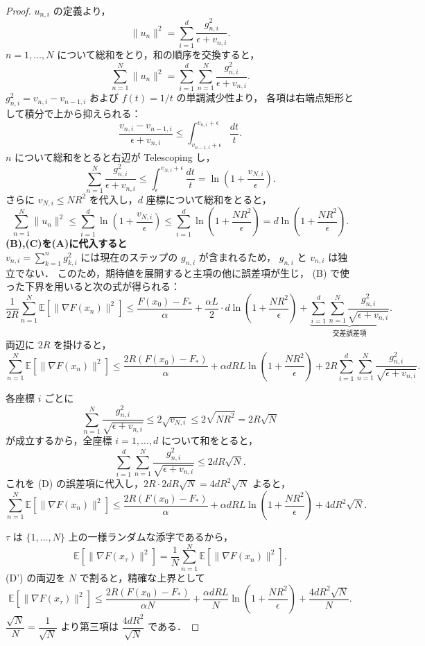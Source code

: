 \documentclass[dvipdfmx,a4paper,11pt]{jsarticle}
\begin{document}
\begin{proof}
\noindent
$u_{n,i}$ の定義より，
\[
    \|u_n\|^2 = \sum_{i=1}^d \frac{g_{n,i}^2}{\epsilon + v_{n,i}}.
\]
$n = 1, \ldots, N$ について総和をとり，和の順序を交換すると，
\[
    \sum_{n=1}^N \|u_n\|^2
    = \sum_{i=1}^d \sum_{n=1}^N \frac{g_{n,i}^2}{\epsilon + v_{n,i}}.
\]
$g_{n,i}^2 = v_{n,i} - v_{n-1,i}$ および $f(t)=1/t$ の単調減少性より，
各項は右端点矩形として積分で上から抑えられる：
\[
    \frac{v_{n,i}-v_{n-1,i}}{\epsilon+v_{n,i}}
    \leq \int_{v_{n-1,i}+\epsilon}^{v_{n,i}+\epsilon} \frac{dt}{t}.
\]
$n$ について総和をとると右辺が Telescoping し，
\[
    \sum_{n=1}^N \frac{g_{n,i}^2}{\epsilon+v_{n,i}}
    \leq \int_\epsilon^{v_{N,i}+\epsilon}\frac{dt}{t}
    = \ln\!\left(1+\frac{v_{N,i}}{\epsilon}\right).
\]
さらに $v_{N,i} \leq NR^2$ を代入し，$d$ 座標について総和をとると，
\[
    \sum_{n=1}^N \|u_n\|^2
    \leq \sum_{i=1}^d \ln\!\left(1+\frac{v_{N,i}}{\epsilon}\right)
    \leq \sum_{i=1}^d \ln\!\left(1+\frac{NR^2}{\epsilon}\right)
    = d\ln\!\left(1+\frac{NR^2}{\epsilon}\right).
    \tag{C}
\]
\textbf{(B),(C)を(A)に代入すると}\\
\noindent
$v_{n,i} = \sum_{k=1}^n g_{k,i}^2$ には現在のステップの $g_{n,i}$ が含まれるため，
$g_{n,i}$ と $v_{n,i}$ は独立でない．
このため，期待値を展開すると主項の他に誤差項が生じ，
(B) で使った下界を用いると次の式が得られる：
\[
    \frac{1}{2R}\sum_{n=1}^N \mathbb{E}\!\left[\|\nabla F(x_n)\|^2\right]
    \leq \frac{F(x_0)-F_*}{\alpha}
    + \frac{\alpha L}{2}\cdot d\ln\!\left(1+\frac{NR^2}{\epsilon}\right)
    + \underbrace{\sum_{i=1}^d\sum_{n=1}^N \frac{g_{n,i}^2}{\sqrt{\epsilon+v_{n,i}}}}_{\text{交差誤差項}}.
\]
両辺に $2R$ を掛けると，
\[
    \sum_{n=1}^N \mathbb{E}\!\left[\|\nabla F(x_n)\|^2\right]
    \leq \frac{2R(F(x_0)-F_*)}{\alpha}
    + \alpha dRL\ln\!\left(1+\frac{NR^2}{\epsilon}\right)
    + 2R\sum_{i=1}^d\sum_{n=1}^N \frac{g_{n,i}^2}{\sqrt{\epsilon+v_{n,i}}}.
    \tag{D}
\]

\noindent
各座標 $i$ ごとに
\[
    \sum_{n=1}^N \frac{g_{n,i}^2}{\sqrt{\epsilon+v_{n,i}}}
    \leq 2\sqrt{v_{N,i}} \leq 2\sqrt{NR^2} = 2R\sqrt{N}
\]
が成立するから，全座標 $i=1,\ldots,d$ について和をとると，
\[
    \sum_{i=1}^d\sum_{n=1}^N \frac{g_{n,i}^2}{\sqrt{\epsilon+v_{n,i}}}
    \leq 2dR\sqrt{N}.
\]
これを (D) の誤差項に代入し，$2R \cdot 2dR\sqrt{N} = 4dR^2\sqrt{N}$ よると，
\[
    \sum_{n=1}^N \mathbb{E}\!\left[\|\nabla F(x_n)\|^2\right]
    \leq \frac{2R(F(x_0)-F_*)}{\alpha}
    + \alpha dRL\ln\!\left(1+\frac{NR^2}{\epsilon}\right)
    + 4dR^2\sqrt{N}.
    \tag{D'}
\]

\noindent
$\tau$ は $\{1,\ldots,N\}$ 上の一様ランダムな添字であるから，
\[
    \mathbb{E}\!\left[\|\nabla F(x_\tau)\|^2\right]
    = \frac{1}{N}\sum_{n=1}^N \mathbb{E}\!\left[\|\nabla F(x_n)\|^2\right].
\]
(D') の両辺を $N$ で割ると，精確な上界として
\begin{equation}
    \mathbb{E}\!\left[\|\nabla F(x_\tau)\|^2\right]
    \leq \frac{2R(F(x_0)-F_*)}{\alpha N}
    + \frac{\alpha dRL}{N}\ln\!\left(1+\frac{NR^2}{\epsilon}\right)
    + \frac{4dR^2\sqrt{N}}{N}. \label{eq:exact}
\end{equation}
$\dfrac{\sqrt{N}}{N} = \dfrac{1}{\sqrt{N}}$ より第三項は $\dfrac{4dR^2}{\sqrt{N}}$ である．


\end{proof}
\end{document}
